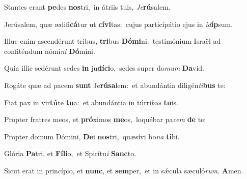 ﻿\setcounter{versecount}{2}



\vs Stantes erant \textbf{pe}des \textbf{nos}tri,~\redgreheightstar in átriis tuis, \textit{Je}\textbf{rú}salem.

\vs Jerúsalem, quæ ædifi\textbf{cá}tur ut \textbf{cí}\-\textbf{vi}\-tas:~\redgreheightstar cujus participátio ejus in \textit{id}\textbf{íp}sum.

\vs Illuc enim ascendérunt tribus, \textbf{tri}bus \textbf{Dó}\textbf{mi}ni:~\redgreheightstar testimónium Israël ad confiténdum nómi\textit{ni} \textbf{Dó}mini.

\vs Quia illic sedérunt sedes \textbf{in} ju\-\textbf{dí}\-\textbf{ci}\-o,~\redgreheightstar sedes super do\textit{mum} \textbf{Da}vid.

\vs Rogáte quæ ad pacem \textbf{sunt} Je\-\textbf{rú}\-\textbf{sa}\-lem:~\redgreheightstar et abundántia diligén\textit{ti}\textbf{bus} te:

\vs Fiat pax in vir\textbf{tú}te \textbf{tu}a:~\redgreheightstar et abundántia in túrri\textit{bus} \textbf{tu}is.

\vs Propter fratres meos, et \textbf{pró}ximos \textbf{me}os,~\redgreheightstar loquébar pa\textit{cem} \textbf{de} te:

\vs Propter domum Dómini, \textbf{De}i \textbf{nos}tri,~\redgreheightstar quæsívi bo\textit{na} \textbf{ti}bi.

\vs Glória \textbf{Pa}tri, et \textbf{Fí}\textbf{li}o,~\redgreheightstar et Spirítu\textit{i} \textbf{Sanc}to.

\vs Sicut erat in princípio, et \textbf{nunc}, et \textbf{sem}per,~\redgreheightstar et in sǽcula sæculó\textit{rum}. \textbf{A}men.


